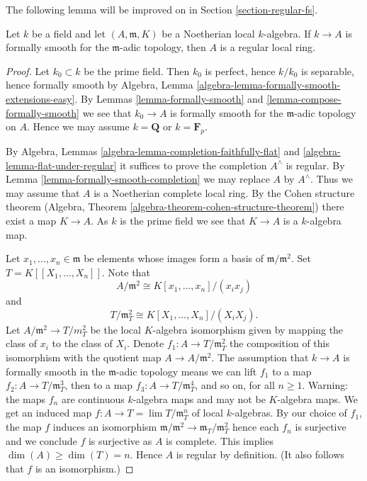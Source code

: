 \noindent
The following lemma will be improved on in
Section \ref{section-regular-fs}.

\begin{lemma}
\label{lemma-fs-implies-regular}
Let $k$ be a field and let $(A, \mathfrak m, K)$ be a Noetherian
local $k$-algebra. If $k \to A$ is formally smooth for the
$\mathfrak m$-adic topology, then $A$ is a regular local ring.
\end{lemma}

\begin{proof}
Let $k_0 \subset k$ be the prime field. Then $k_0$ is perfect, hence
$k / k_0$ is separable, hence formally smooth by
Algebra, Lemma \ref{algebra-lemma-formally-smooth-extensions-easy}. By
Lemmas \ref{lemma-formally-smooth} and \ref{lemma-compose-formally-smooth}
we see that $k_0 \to A$ is formally smooth for the $\mathfrak m$-adic
topology on $A$. Hence we may assume $k = \mathbf{Q}$ or $k = \mathbf{F}_p$.

\medskip\noindent
By Algebra, Lemmas \ref{algebra-lemma-completion-faithfully-flat} and
\ref{algebra-lemma-flat-under-regular} it
suffices to prove the completion $A^\wedge$ is regular.
By Lemma \ref{lemma-formally-smooth-completion} we may replace
$A$ by $A^\wedge$. Thus we may assume that $A$ is a Noetherian
complete local ring. By the Cohen structure theorem
(Algebra, Theorem \ref{algebra-theorem-cohen-structure-theorem})
there exist a map $K \to A$. As $k$ is the prime field we see that
$K \to A$ is a $k$-algebra map.

\medskip\noindent
Let $x_1, \ldots, x_n \in \mathfrak m$ be elements whose images
form a basis of $\mathfrak m/\mathfrak m^2$.
Set $T = K[[X_1, \ldots, X_n]]$. Note that
$$
A/\mathfrak m^2 \cong K[x_1, \ldots, x_n]/(x_ix_j)
$$
and
$$
T/\mathfrak m_T^2 \cong K[X_1, \ldots, X_n]/(X_iX_j).
$$
Let $A/\mathfrak m^2 \to T/m_T^2$ be the local $K$-algebra isomorphism
given by mapping the class of $x_i$ to the class of $X_i$.
Denote $f_1 : A \to T/\mathfrak m_T^2$ the composition of this
isomorphism with the quotient map $A \to A/\mathfrak m^2$.
The assumption that $k \to A$ is formally smooth in the $\mathfrak m$-adic
topology means we can lift $f_1$ to a map
$f_2 : A \to T/\mathfrak{m}_T^3$, then to a map
$f_3 : A \to T/\mathfrak{m}_T^4$, and so on, for all $n \geq 1$.
Warning: the maps $f_n$ are continuous $k$-algebra maps and may not
be $K$-algebra maps. We get an induced map
$f : A \to T = \lim T/\mathfrak m_T^n$ of local $k$-algebras.
By our choice of $f_1$, the map $f$ induces an
isomorphism $\mathfrak m/\mathfrak m^2 \to \mathfrak m_T/\mathfrak m_T^2$
hence each $f_n$ is surjective and we conclude $f$ is surjective as $A$ is
complete. This implies $\dim(A) \geq \dim(T) = n$. Hence $A$ is regular
by definition. (It also follows that $f$ is an isomorphism.)
\end{proof}

